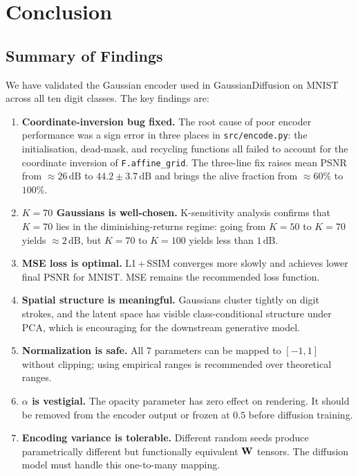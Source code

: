 \section{Conclusion}
\label{sec:conclusion}

\subsection{Summary of Findings}

We have validated the Gaussian encoder used in GaussianDiffusion on MNIST across
all ten digit classes.  The key findings are:

\begin{enumerate}[leftmargin=2em]
  \item \textbf{Coordinate-inversion bug fixed.}
        The root cause of poor encoder performance was a sign error in three places
        in \texttt{src/encode.py}: the initialisation, dead-mask, and recycling
        functions all failed to account for the coordinate inversion of
        \texttt{F.affine\_grid}.  The three-line fix raises mean PSNR from
        ${\approx}26\,\text{dB}$ to $44.2 \pm 3.7\,\text{dB}$ and brings the
        alive fraction from ${\approx}60\%$ to $100\%$.

  \item \textbf{$K=70$ Gaussians is well-chosen.}
        K-sensitivity analysis confirms that $K=70$ lies in the diminishing-returns
        regime: going from $K=50$ to $K=70$ yields ${\approx}2\,\text{dB}$, but
        $K=70$ to $K=100$ yields less than $1\,\text{dB}$.

  \item \textbf{MSE loss is optimal.}
        L1\,+\,SSIM converges more slowly and achieves lower final PSNR for MNIST.
        MSE remains the recommended loss function.

  \item \textbf{Spatial structure is meaningful.}
        Gaussians cluster tightly on digit strokes, and the latent space has
        visible class-conditional structure under PCA, which is encouraging for
        the downstream generative model.

  \item \textbf{Normalization is safe.}
        All 7 parameters can be mapped to $[-1, 1]$ without clipping;
        using empirical ranges is recommended over theoretical ranges.

  \item \textbf{$\alpha$ is vestigial.}
        The opacity parameter has zero effect on rendering.
        It should be removed from the encoder output or frozen at $0.5$
        before diffusion training.

  \item \textbf{Encoding variance is tolerable.}
        Different random seeds produce parametrically different but functionally
        equivalent $\mathbf{W}$ tensors.  The diffusion model must handle this
        one-to-many mapping.
\end{enumerate}

